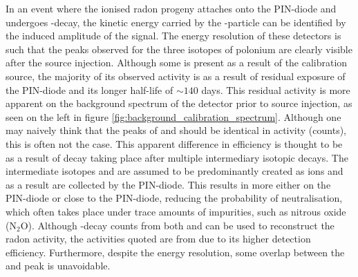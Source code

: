 In an event where the ionised radon progeny attaches onto the PIN-diode and undergoes \alpha{}-decay, the kinetic energy carried by the \alpha{}-particle can be identified by the induced amplitude of the signal. The energy resolution of these detectors is such that the peaks observed for the three isotopes of polonium are clearly visible after the source injection. Although some \PoTOZ{} is present as a result of the calibration source, the majority of its observed activity is as a result of residual exposure of the PIN-diode and its longer half-life of $\sim140$ days. This residual activity is more apparent on the background spectrum of the detector prior to source injection, as seen on the left in figure \ref{fig:background_calibration_spectrum}. Although one may naively think that the peaks of \PoTOF{} and \PoTOF{} should be identical in activity (counts), this is often not the case. This apparent difference in efficiency is thought to be as a result of \PoTOF{} decay taking place after multiple intermediary isotopic decays. The intermediate isotopes \PbTOF{} and \BiTOE{} are assumed to be predominantly created as ions and as a result are collected by the PIN-diode. This results in more \PbTOF{} either on the PIN-diode or close to the PIN-diode, reducing the probability of neutralisation, which often takes place under trace amounts of impurities, such as nitrous oxide (N$_{2}$O). Although \alpha{}-decay counts from both \PoTOE{} and \PoTOF{} can be used to reconstruct the radon activity, the activities quoted are from \PoTOF{} due to its higher detection efficiency. Furthermore, despite the energy resolution, some overlap between the \PoTOE{} and \PoTOZ{} peak is unavoidable.
%
